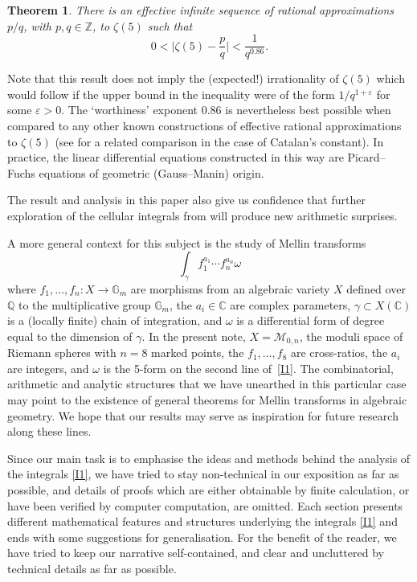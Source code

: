 \documentclass[12pt,reqno]{amsart}
\newtheorem{theorem}{Theorem}
\theoremstyle{remark}
\let\eps\varepsilon
\begin{document}
\begin{theorem}
\label{th:z5}
There is an \emph{effective} infinite sequence of  rational approximations $p/q$, with $p,q\in \mathbb{Z}$, to $\zeta(5)$ such that
\[
0<\bigg|\zeta(5)-\frac pq\bigg|<\frac1{q^{0.86}}.
\]
\end{theorem}

Note that this result does not imply the (expected!) irrationality of $\zeta(5)$  which would follow if the upper bound in the inequality were of the form   $1/q^{1+\eps}$ for some $\eps>0$. 
The `worthiness' exponent $0.86$ is nevertheless best possible when compared to any other known constructions of effective rational approximations to $\zeta(5)$
(see \cite{Ne16,Vi22} for a related comparison in the case of Catalan's constant).
In practice, the linear differential equations constructed in this way are  Picard--Fuchs equations  of geometric (Gauss--Manin) origin. 

The result and analysis in this paper also give us confidence that further exploration of the cellular integrals from \cite{Br16} will produce new arithmetic surprises.

A  more general context for this subject is the study of Mellin transforms
\begin{equation*}
\int_{\gamma}  f_1^{a_1} \dotsb f_n^{a_n} \omega
\end{equation*}
where $f_1,\dots, f_n\colon X \to \mathbb{G}_m$ are morphisms from an algebraic variety  $X$ defined over $\mathbb{Q}$ to the multiplicative  group $\mathbb{G}_m$, the $a_i \in\mathbb{C}$ are complex parameters, $\gamma \subset X(\mathbb{C})$ is a (locally finite)  chain of integration, and $\omega$ is a differential form of degree equal to the dimension of $\gamma$.  In the present note, $X= \mathcal{M}_{0,n}$, the moduli space of Riemann spheres  with $n=8$ marked points, the $f_1,\dots, f_8$ are  cross-ratios, the $a_i$ are integers, and $\omega$ is the 5-form on the second line of~\eqref{I1}.   The combinatorial, arithmetic and analytic structures that we have unearthed in this particular case may  point to the existence of general theorems for  Mellin transforms in algebraic geometry. We hope that our results  may serve as inspiration for future research along these lines.

Since our main task is to emphasise the  ideas and methods behind the analysis of the integrals \eqref{I1}, we have tried to stay non-technical in our exposition as far as possible, and  details of proofs which are either obtainable by finite calculation, or have been verified by computer computation, are omitted. Each section presents different  mathematical features and  structures underlying the integrals \eqref{I1} and ends with some suggestions for generalisation. For the benefit of the reader, 
we have tried to keep our narrative self-contained, and clear and uncluttered by technical details as far as possible. 
\end{document}
